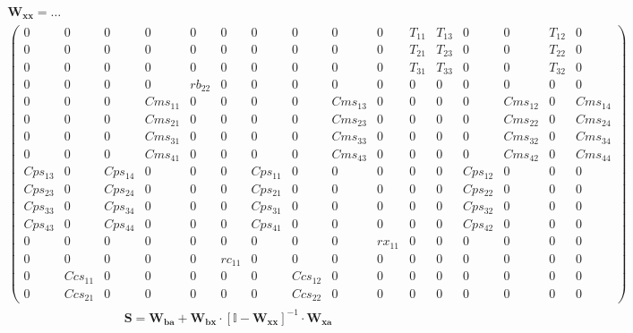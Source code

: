 \begin{multline} \mathbf{W_{xx}} =\ldots\\ \left(\begin{smallmatrix} 0 & 0 & 0
& 0 & 0 & 0 & 0 & 0 & 0 & 0 & T_{11} & T_{13} & 0 & 0 & T_{12} & 0 \\
0 & 0 & 0 & 0 & 0 & 0 & 0 & 0 & 0 & 0 & T_{21} & T_{23} & 0 & 0 &
T_{22} & 0 \\ 0 & 0 & 0 & 0 & 0 & 0 & 0 & 0 & 0 & 0 & T_{31} & T_{33}
& 0 & 0 & T_{32} & 0 \\ 0 & 0 & 0 & 0 & rb_{22} & 0 & 0 & 0 & 0 & 0 &
0 & 0 & 0 & 0 & 0 & 0 \\ 0 & 0 & 0 & Cms_{11} & 0 & 0 & 0 & 0 &
Cms_{13} & 0 & 0 & 0 & 0 & Cms_{12} & 0 & Cms_{14} \\ 0 & 0 & 0 &
Cms_{21} & 0 & 0 & 0 & 0 & Cms_{23} & 0 & 0 & 0 & 0 & Cms_{22} & 0 &
Cms_{24} \\ 0 & 0 & 0 & Cms_{31} & 0 & 0 & 0 & 0 & Cms_{33} & 0 & 0 &
0 & 0 & Cms_{32} & 0 & Cms_{34} \\ 0 & 0 & 0 & Cms_{41} & 0 & 0 & 0 &
0 & Cms_{43} & 0 & 0 & 0 & 0 & Cms_{42} & 0 & Cms_{44} \\ Cps_{13} & 0
& Cps_{14} & 0 & 0 & 0 & Cps_{11} & 0 & 0 & 0 & 0 & 0 & Cps_{12} & 0 &
0 & 0 \\ Cps_{23} & 0 & Cps_{24} & 0 & 0 & 0 & Cps_{21} & 0 & 0 & 0 &
0 & 0 & Cps_{22} & 0 & 0 & 0 \\ Cps_{33} & 0 & Cps_{34} & 0 & 0 & 0 &
Cps_{31} & 0 & 0 & 0 & 0 & 0 & Cps_{32} & 0 & 0 & 0 \\ Cps_{43} & 0 &
Cps_{44} & 0 & 0 & 0 & Cps_{41} & 0 & 0 & 0 & 0 & 0 & Cps_{42} & 0 & 0
& 0 \\ 0 & 0 & 0 & 0 & 0 & 0 & 0 & 0 & 0 & rx_{11} & 0 & 0 & 0 & 0 & 0
& 0 \\ 0 & 0 & 0 & 0 & 0 & rc_{11} & 0 & 0 & 0 & 0 & 0 & 0 & 0 & 0 & 0
& 0 \\ 0 & Ccs_{11} & 0 & 0 & 0 & 0 & 0 & Ccs_{12} & 0 & 0 & 0 & 0 & 0
& 0 & 0 & 0 \\ 0 & Ccs_{21} & 0 & 0 & 0 & 0 & 0 & Ccs_{22} & 0 & 0 & 0
& 0 & 0 & 0 & 0 & 0 \end{smallmatrix}\right) \end{multline}
\begin{multline} \mathbf{S}=\mathbf{W_{ba}}+\mathbf{W_{bx}}\cdot\left[
\mathbb{I}  -\mathbf{W_{xx}}\right]^{-1}\cdot\mathbf{W_{xa}}
\end{multline}
